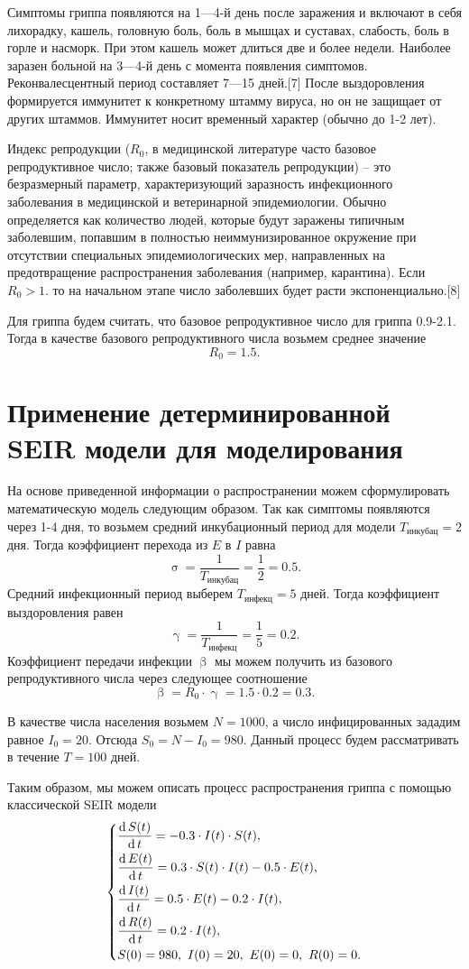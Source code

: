\documentclass[a4paper, 14pt]{extreport}
\numberwithin{equation}{section}
\renewcommand{\beta}{\upbeta}
\renewcommand{\gamma}{\upgamma}
\renewcommand{\sigma}{\upsigma}
\renewcommand{\d}{\operatorname{d}}
\begin{document}
	Симптомы гриппа появляются на 1—4-й день после заражения и включают в себя лихорадку, кашель, головную боль, боль в мышцах и суставах, слабость, боль в горле и насморк. При этом кашель может длиться две и более недели. Наиболее заразен больной на 3—4-й день с момента появления симптомов. Реконвалесцентный период составляет 7—15 дней.[7] После выздоровления формируется иммунитет к конкретному штамму вируса, но он не защищает от других штаммов. Иммунитет носит временный характер (обычно до 1-2 лет).
	
	Индекс репродукции ($R_{0}$, в медицинской литературе часто базовое репродуктивное число; также базовый показатель репродукции) -- это безразмерный параметр, характеризующий заразность инфекционного заболевания в медицинской и ветеринарной эпидемиологии. Обычно определяется как количество людей, которые будут заражены типичным заболевшим, попавшим в полностью неиммунизированное окружение при отсутствии специальных эпидемиологических мер, направленных на предотвращение распространения заболевания (например, карантина). Если $R_0 > 1$. то на начальном этапе число заболевших будет расти экспоненциально.[8]
	
	Для гриппа будем считать, что базовое репродуктивное число для гриппа 0.9-2.1. Тогда в качестве базового репродуктивного числа возьмем среднее значение $$R_0 = 1.5.$$
	\section{Применение детерминированной SEIR модели для моделирования}
	На основе приведенной информации о распространении можем сформулировать математическую модель следующим образом. Так как симптомы появляются через 1-4 дня, то возьмем средний инкубационный период для модели $T_\text{инкубац} = 2$ дня. Тогда коэффициент перехода из $E$ в $I$ равна
	$$\sigma = \dfrac{1}{T_\text{инкубац}} = \dfrac 1 2 = 0.5.$$
	Средний инфекционный период выберем $T_\text{инфекц}=5$ дней.
	Тогда коэффициент выздоровления равен
	$$\gamma = \dfrac{1}{T_\text{инфекц}} = \dfrac 1 5 = 0.2.$$
	Коэффициент передачи инфекции $\beta$ мы можем получить из  базового репродуктивного числа через следующее соотношение
	$$\beta = R_0\cdot \gamma = 1.5\cdot 0.2 = 0.3.$$
	
	В качестве числа населения возьмем $N=1000$, а число инфицированных зададим равное $I_0 = 20$. Отсюда $S_0 = N - I_0 = 980$. Данный процесс будем рассматривать в течение $T=100$ дней.
	
	Таким образом, мы можем описать процесс распространения гриппа с помощью классической SEIR модели
	\begin{equation*}
		\begin{dcases}
			\dfrac {\d S(t)}{\d t} = - 0.3 \cdot I(t)\cdot S(t),\\
			\dfrac {\d E(t)}{\d t} = 0.3 \cdot S(t)\cdot I(t) - 0.5\cdot E(t),\\
			\dfrac{\d I(t)}{\d t} =0.5 \cdot E(t) - 0.2\cdot I(t),\\
			\dfrac{\d R(t)}{\d t} = 0.2\cdot I(t),\\
			S(0) = 980,\ I(0) = 20,\ E(0) = 0,\ R(0) = 0.
		\end{dcases}
	\end{equation*} 
	
\end{document}
